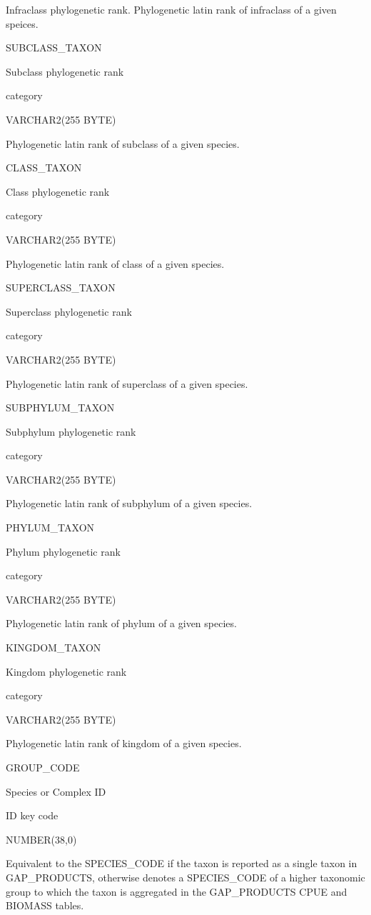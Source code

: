 \documentclass[
  letterpaper,
  oneside,
  open=any]{scrbook}
\begin{document}
Infraclass phylogenetic rank. Phylogenetic latin rank of infraclass of a
given speices.

SUBCLASS\_TAXON

Subclass phylogenetic rank

category

VARCHAR2(255 BYTE)

Phylogenetic latin rank of subclass of a given species.

CLASS\_TAXON

Class phylogenetic rank

category

VARCHAR2(255 BYTE)

Phylogenetic latin rank of class of a given species.

SUPERCLASS\_TAXON

Superclass phylogenetic rank

category

VARCHAR2(255 BYTE)

Phylogenetic latin rank of superclass of a given species.

SUBPHYLUM\_TAXON

Subphylum phylogenetic rank

category

VARCHAR2(255 BYTE)

Phylogenetic latin rank of subphylum of a given species.

PHYLUM\_TAXON

Phylum phylogenetic rank

category

VARCHAR2(255 BYTE)

Phylogenetic latin rank of phylum of a given species.

KINGDOM\_TAXON

Kingdom phylogenetic rank

category

VARCHAR2(255 BYTE)

Phylogenetic latin rank of kingdom of a given species.

GROUP\_CODE

Species or Complex ID

ID key code

NUMBER(38,0)

Equivalent to the SPECIES\_CODE if the taxon is reported as a single
taxon in GAP\_PRODUCTS, otherwise denotes a SPECIES\_CODE of a higher
taxonomic group to which the taxon is aggregated in the GAP\_PRODUCTS
CPUE and BIOMASS tables.
\end{document}
